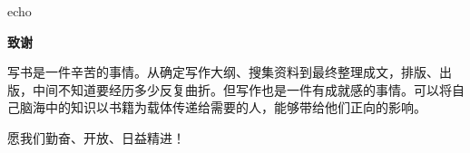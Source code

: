 \documentclass[]{ctexbook}
\begin{document}


echo\backmatter
\printindex
\newpage
\thispagestyle{empty}

\begin{center}  %
     \Large\bfseries 致谢\\[1cm]  %
\end{center}

写书是一件辛苦的事情。从确定写作大纲、搜集资料到最终整理成文，排版、出版，中间不知道要经历多少反复曲折。但写作也是一件有成就感的事情。可以将自己脑海中的知识以书籍为载体传递给需要的人，能够带给他们正向的影响。
\par  %
愿我们勤奋、开放、日益精进！
\end{document}
